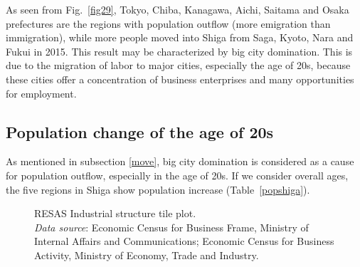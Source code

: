 \documentclass[10pt, conference, compsocconf]{IEEEtran}
\begin{document}
As seen from Fig.~\ref{fig29}, Tokyo, Chiba, Kanagawa, Aichi, Saitama and Osaka prefectures are the regions with population outflow (more emigration than immigration), while more people moved into Shiga from Saga, Kyoto, Nara and Fukui in 2015. 
This result may be characterized by big city domination. This is due to the migration of labor to major cities, especially the age of 20s, because these cities offer a concentration of business enterprises and
many opportunities for employment.


\subsection{Population change of the age of 20s}\label{reg}
As mentioned in subsection \ref{move}, big city domination is considered as a cause 
for population outflow, especially in the age of 20s. If we consider overall ages, the five regions in Shiga show population increase (Table~\ref{popshiga}).
\begin{figure}[!t]
\centering
{}
\qquad
{}
\caption{RESAS Industrial structure tile plot.
\\{\it Data source}: Economic Census for Business Frame, Ministry of Internal Affairs and Communications;
 Economic Census for Business Activity, Ministry of Economy, Trade and Industry.
}\label{industry}
\end{figure}
\end{document}
